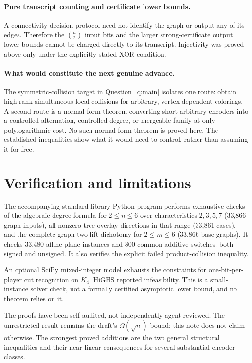 \documentclass[11pt]{article}
\theoremstyle{definition}\newtheorem{definition}[theorem]{Definition}
\theoremstyle{remark}\newtheorem{remark}[theorem]{Remark}
\begin{document}
\paragraph{Pure transcript counting and certificate lower bounds.}
A connectivity decision protocol need not identify the graph or output any of its edges. Therefore the $\binom n2$ input bits and the larger strong-certificate output lower bounds cannot be charged directly to its transcript. Injectivity was proved above only under the explicitly stated XOR condition.

\paragraph{What would constitute the next genuine advance.}
The symmetric-collision target in Question~\ref{q:main} isolates one route: obtain high-rank simultaneous local collisions for arbitrary, vertex-dependent colorings. A second route is a normal-form theorem converting short arbitrary encoders into a controlled-alternation, controlled-degree, or mergeable family at only polylogarithmic cost. No such normal-form theorem is proved here. The established inequalities show what it would need to control, rather than assuming it for free.

\section{Verification and limitations}
The accompanying standard-library Python program performs exhaustive checks of the algebraic-degree formula for $2\le n\le6$ over characteristics $2,3,5,7$ (33,866 graph inputs), all nonzero tree-overlay directions in that range (33,861 cases), and the complete-graph two-lift dichotomy for $2\le m\le6$ (33,866 base graphs). It checks 33,480 affine-plane instances and 800 common-additive switches, both signed and unsigned. It also verifies the explicit failed product-collision inequality.

An optional SciPy mixed-integer model exhausts the constraints for one-bit-per-player cut recognition on $K_4$; HiGHS reported infeasibility. This is a small-instance solver check, not a formally certified asymptotic lower bound, and no theorem relies on it.

The proofs have been self-audited, not independently agent-reviewed. The unrestricted result remains the draft's $\Omega(\sqrt n)$ bound; this note does not claim otherwise. The strongest proved additions are the two general structural inequalities and their near-linear consequences for several substantial encoder classes.
\end{document}

